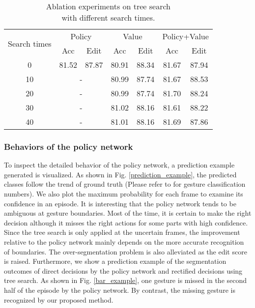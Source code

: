 \documentclass[letterpaper, 10 pt, conference]{ieeeconf}
\begin{document}
\begin{table}[t]
\caption{Ablation experiments on tree search \protect \\ with different search times.}
	\label{tab:search_times}
	\centering
	\begin{tabular}{c|cccccc}
		\hline
		\multirow{2}{*}{Search times} & \multicolumn{2}{c}{Policy} & \multicolumn{2}{c}{Value} & \multicolumn{2}{c}{Policy+Value} \\
		& Acc          & Edit        & Acc         & Edit        & Acc             & Edit           \\ \hline
		0                             & 81.52        & 87.87       & 80.91       & 88.34       & 81.67           & 87.94          \\
		10                            & \multicolumn{2}{c}{-}      & 80.99       & 87.74       & 81.67           & 88.53          \\
		20                            & \multicolumn{2}{c}{-}      & 80.99       & 87.74       & 81.70           & 88.24          \\
		30                            & \multicolumn{2}{c}{-}      & 81.02       & 88.16       & 81.61           & 88.22          \\
		40                            & \multicolumn{2}{c}{-}      & 81.01       & 88.16       & 81.69           & 87.86          \\ \hline
	\end{tabular}
	\vspace{-3mm}
\end{table}


\subsubsection{Behaviors of the policy network}
To inspect the detailed behavior of the policy network, a prediction example generated is visualized. As shown in Fig. \ref{prediction_example}, the predicted classes follow the trend of ground truth (Please refer to \cite{ahmidi2017dataset} for gesture classification numbers). We also plot the maximum probability for each frame to examine its confidence in an episode. It is interesting that the policy network tends to be ambiguous at gesture boundaries. Most of the time, it is certain to make the right decision although it misses the right actions for some parts with high confidence. Since the tree search is only applied at the uncertain frames, the improvement relative to the policy network mainly depends on the more accurate recognition of boundaries. The over-segmentation problem is also alleviated as the edit score is raised. Furthermore, we show a prediction example of the segmentation outcomes of direct decisions by the policy network and rectified decisions using tree search. As shown in Fig. \ref{bar_example}, one gesture is missed in the second half of the episode by the policy network. By contrast, the missing gesture is recognized by our proposed method.
\end{document}
